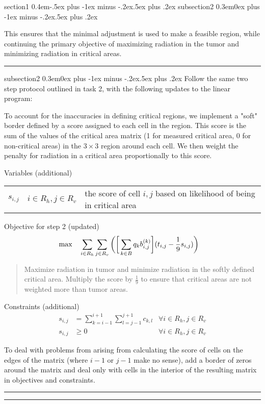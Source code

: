\documentclass[12pt]{article}
\makeatletter
\newenvironment{task}{\@startsection
       {section}{1}
       {0.4em}{-.5ex plus -1ex minus -.2ex}{.5ex plus .2ex}
       {\pagebreak[3]\large\bf\noindent{Task}}}
       {\nopagebreak[3]\vspace{3ex}\begin{center}\rule{1\linewidth}{.3pt}\end{center}}
\newenvironment{subtask}{\@startsection
       {subsection}{2}
       {0.3em}{0ex plus -1ex minus -.2ex}{.5ex plus .2ex}
       {\pagebreak[3]\large}}
       {\nopagebreak[3]\vspace{3ex}\begin{center}\rule{0.5\linewidth}{.3pt}\end{center}}
\makeatother
\begin{document}
\begin{task}{}
\begin{subtask}{}
\begin{enumerate}
This ensures that the minimal adjustment is used to make a feasible region, while continuing the primary objective of maximizing radiation in the tumor and minimizing radiation in critical areas.
\end{enumerate}

\end{subtask}


\begin{subtask}{}
Follow the same two step protocol outlined in task 2, with the following updates to the linear program:

To account for the inaccuracies in defining critical regions, we implement a "soft" border defined by a score assigned to each cell in the region.  This score is the sum of the values of the critical area matrix (1 for measured critical area, 0 for non-critical areas) in the $3 \times 3$ region around each cell.  We then weight the penalty for radiation in a critical area proportionally to this score.

Variables (additional)\\ 
\begin{tabular}{lll}
	$s_{i,j}$ & $i \in R_h, j \in R_v$ &the score of cell $i,j$ based on likelihood of being in critical area\\
\end{tabular}

Objective for step 2 (updated)
\begin{align}
	\max \quad
	& \sum_{i\in R_h} \sum_{j \in R_v}\bigg{(} \bigg{[} \sum_{k \in B} q_k b^{(k)}_{i,j} \bigg{]} (t_{i,j} - \frac{1}{9}s_{i,j}) \bigg{)}
\end{align}
\begin{quote}Maximize radiation in tumor and minimize radiation in the softly defined critical area. Multiply the score by $\frac{1}{9}$ to ensure that critical areas are not weighted more than tumor areas.\end{quote}

Constraints (additional)
\begin{align}
	s_{i,j} & = \sum_{k=i-1}^{i+1} \sum_{l=j-1}^{j+1} c_{k,l} & \forall i \in R_h, j \in R_v \\
	s_{i,j} & \geq 0 & \forall i \in R_h, j \in R_v
\end{align}

To deal with problems from arising from calculating the score of cells on the edges of the matrix (where $i-1$ or $j-1$ make no sense), add a border of zeros around the matrix and deal only with cells in the interior of the resulting matrix in objectives and constraints.


\end{subtask}
\end{task}
\end{document}
